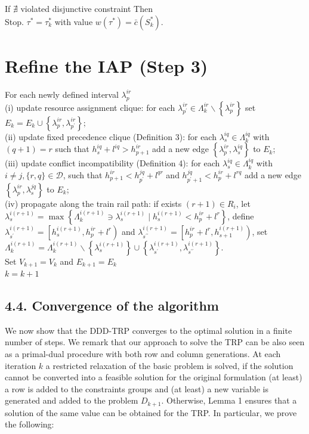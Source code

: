 \documentclass[10pt]{article}
\begin{document}
If $\nexists$ violated disjunctive constraint Then\\
Stop. $\tau^{*}=\tau_{k}^{*}$ with value $w\left(\tau^{*}\right)=\bar{c}\left(S_{k}^{*}\right)$.

\section*{Refine the IAP (Step 3)}
For each newly defined interval $\lambda_{p}^{i r}$\\
(i) update resource assignment clique: for each $\lambda_{p^{\prime}}^{i r} \in \Lambda_{k}^{i r} \backslash \left\{\lambda_{p}^{i r}\right\}$ set $E_{k}=E_{k} \cup\left\{\lambda_{p}^{i r}, \lambda_{p^{\prime}}^{i r}\right\} ;$\\
(ii) update fixed precedence clique (Definition 3): for each $\lambda_{s}^{i q} \in \Lambda_{k}^{i q}$ with $(q+1)=r$ such that $h_{s}^{i q}+l^{i q}>h_{p+1}^{i r}$ add a new edge $\left\{\lambda_{p}^{i r}, \lambda_{s}^{i q}\right\}$ to $E_{k}$;\\
(iii) update conflict incompatibility (Definition 4): for each $\lambda_{s}^{i q} \in \Lambda_{k}^{i q}$ with $i \neq j,\{r, q\} \in \mathcal{D}$, such that $h_{p+1}^{i r}<h_{p^{\prime}}^{j q}+l^{q r}$ and $h_{p^{\prime}+1}^{j q}<h_{p}^{i r}+l^{r q}$ add a new edge $\left\{\lambda_{p}^{i r}, \lambda_{s}^{j q}\right\}$ to $E_{k}$;\\
(iv) propagate along the train rail path: if exists $(r+1) \in R_{i}$, let $\lambda_{s}^{i(r+1)}=\max \left\{\Lambda_{k}^{i(r+1)} \ni \lambda_{s}^{i(r+1)} \mid h_{s}^{i(r+1)}<\right. \left.h_{p}^{i r}+l^{r}\right\}$, define $\lambda_{s^{\prime}}^{i(r+1)}=\left[h_{s}^{i(r+1)}, h_{p}^{i r}+l^{r}\right)$ and $\lambda_{s^{\prime \prime}}^{i(r+1)}= \left[h_{p}^{i r}+l^{r}, h_{s+1}^{i(r+1)}\right)$, set $\Lambda_{k}^{i(r+1)}=\Lambda_{k}^{i(r+1)} \backslash\left\{\lambda_{s}^{i(r+1)}\right\} \cup \left\{\lambda_{s^{\prime}}^{i(r+1)}, \lambda_{s^{\prime \prime}}^{i(r+1)}\right\}$.\\
Set $V_{k+1}=V_{k}$ and $E_{k+1}=E_{k}$\\
$k=k+1$

\subsection*{4.4. Convergence of the algorithm}
We now show that the DDD-TRP converges to the optimal solution in a finite number of steps. We remark that our approach to solve the TRP can be also seen as a primal-dual procedure with both row and column generations. At each iteration $k$ a restricted relaxation of the basic problem is solved, if the solution cannot be converted into a feasible solution for the original formulation (at least) a row is added to the constraints groups and (at least) a new variable is generated and added to the problem $D_{k+1}$. Otherwise, Lemma 1 ensures that a solution of the same value can be obtained for the TRP. In particular, we prove the following:
\end{document}
